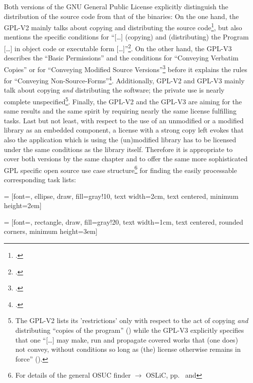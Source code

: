 Both versions of the GNU General Public License explicitly distinguish the
distribution of the source code from that of the binaries: On the one hand, the
GPL-V2 mainly talks about copying and distributing the source
code\footcite[cf.][\nopage wp.\ §1, §2]{Gpl20OsiLicense1991a}, but also mentions
the specific conditions for \enquote{[\ldots] (copying) and (distributing) the
Program [\ldots] in object code or executable form
[\ldots]}\footcite[cf.][\nopage wp.\ §3]{Gpl20OsiLicense1991a}. On the other
hand, the GPL-V3 describes the \enquote{Basic Permissions} and the conditions
for \enquote{Conveying Verbatim Copies} or for \enquote{Conveying Modified
Source Versions}\footcite[cf.][\nopage wp.\ §2, §4, §5]{Gpl30OsiLicense2007a}
before it explains the rules for \enquote{Conveying
Non-Source-Forms}\footcite[cf.][\nopage wp.\ §2, §4, §5]{Gpl30OsiLicense2007a}.
Additionally, GPL-V2 and GPL-V3 mainly talk about copying \emph{and}
distributing the software; the private use is nearly complete
unspecified\footnote{The GPL-V2 lists its 'restrictions' only with respect to
the act of copying \emph{and} distributing \enquote{copies of the program}
(\cite[cf.][\nopage wp.\ §1, §2, §4 et passim; emphasizings by
KR]{Gpl20OsiLicense1991a}) while the GPL-V3 explicitly specifies that one
\enquote{[\ldots] may make, run and propagate covered works that (one does) not
convey, without conditions so long as (the) license otherwise remains in force}
(\cite[cf.][\nopage wp.\ §2]{Gpl30OsiLicense2007a}).}. Finally, the GPL-V2 and
the GPL-V3 are aiming for the same results and the same spirit by requiring
nearly the same license fulfilling tasks. Last but not least, with respect to
the use of an unmodified or a modified library as an embedded component, a
license with a strong copy left evokes that also the application which is using
the (un)modified library has to be licensed under the same conditions as the
library itself. Therefore it is appropriate to cover both versions by the same
chapter and to offer the same more sophisticated GPL specific open source use
case structure\footnote{For details of the general OSUC finder $\rightarrow$
OSLiC, pp.\ \pageref{OsucTokens} and \pageref{OsucDefinitionTree}} for finding
the easily processable corresponding task lists:
 
 = [font=\scriptsize, ellipse, draw, fill=gray!10, 
    text width=2cm, text centered, minimum height=2em]


 = [font=\tiny, rectangle, draw, fill=gray!20, 
    text width=1cm, text centered, rounded corners, minimum height=3em]

